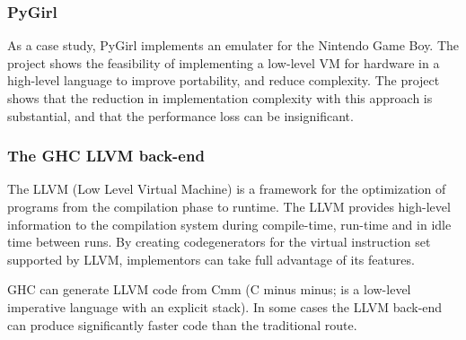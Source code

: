 \subsubsection{PyGirl}

As a case study, PyGirl implements an emulater for the Nintendo Game Boy. The project 
shows the feasibility of implementing a low-level VM for hardware in a high-level 
language to improve portability, and reduce complexity. The project shows that the
reduction in implementation complexity with this approach is substantial, 
and that the performance loss can be insignificant.
\cite{bruni2009pygirl}

\subsubsection{The GHC LLVM back-end}

The LLVM (Low Level Virtual Machine) is a framework for the optimization of 
programs from the compilation phase to runtime. The LLVM provides high-level information 
to the compilation system during compile-time, run-time and in idle time between
runs. By creating codegenerators for the virtual instruction set supported by
LLVM, implementors can take full advantage of its features.
\cite{lattner2004llvm}

GHC can generate LLVM code from Cmm (C minus minus; is a low-level imperative
language with an explicit stack). In some cases the 
LLVM back-end can produce significantly faster code than the traditional route. 
\cite{marlow2012glasgow, terei2010llvm}

